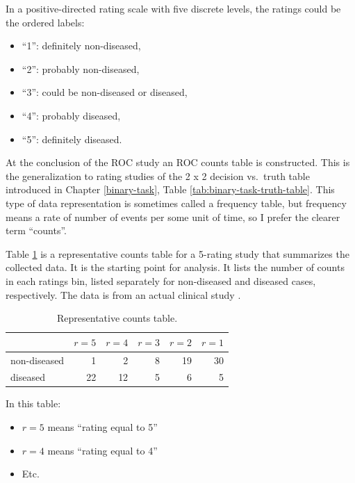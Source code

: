 \documentclass[
]{book}
\providecommand{\tightlist}{%
  \setlength{\itemsep}{0pt}\setlength{\parskip}{0pt}}
\begin{document}
In a positive-directed rating scale with five discrete levels, the ratings could be the ordered labels:

\begin{itemize}
\tightlist
\item
  ``1'': definitely non-diseased,
\item
  ``2'': probably non-diseased,
\item
  ``3'': could be non-diseased or diseased,
\item
  ``4'': probably diseased,
\item
  ``5'': definitely diseased.
\end{itemize}

At the conclusion of the ROC study an ROC counts table is constructed. This is the generalization to rating studies of the 2 x 2 decision vs.~truth table introduced in Chapter \ref{binary-task}, Table \ref{tab:binary-task-truth-table}. This type of data representation is sometimes called a frequency table, but frequency means a rate of number of events per some unit of time, so I prefer the clearer term ``counts''.

Table \ref{tab:ratings-paradigm-example-table} is a representative counts table for a 5-rating study that summarizes the collected data. It is the starting point for analysis. It lists the number of counts in each ratings bin, listed separately for non-diseased and diseased cases, respectively. The data is from an actual clinical study \citep{RN4343}.

\begin{table}

\caption{\label{tab:ratings-paradigm-example-table}Representative counts table.}
\centering
\begin{tabular}[t]{l|r|r|r|r|r}
\hline
  & $r = 5$ & $r = 4$ & $r = 3$ & $r = 2$ & $r = 1$\\
\hline
non-diseased & 1 & 2 & 8 & 19 & 30\\
\hline
diseased & 22 & 12 & 5 & 6 & 5\\
\hline
\end{tabular}
\end{table}

In this table:

\begin{itemize}
\tightlist
\item
  \(r = 5\) means ``rating equal to 5''
\item
  \(r = 4\) means ``rating equal to 4''
\item
  Etc.
\end{itemize}
\end{document}
